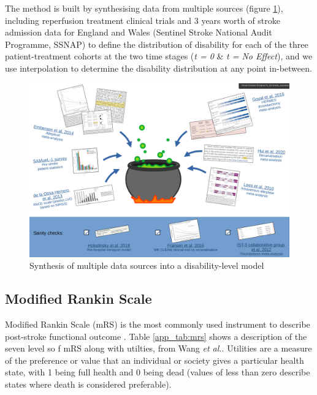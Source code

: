 The method is built by synthesising data from multiple sources (figure \ref{fig:cauldron}), including reperfusion treatment clinical trials \cite{lees_time_2010, emberson_effect_2014, goyal_endovascular_2016, fransen_time_2016, hui_efficacy_2020, de_la_ossa_herrero_design_2013} and 3 years worth of stroke admission data for England and Wales (Sentinel Stroke National Audit Programme, SSNAP) to define the distribution of disability for each of the three patient-treatment cohorts at the two time stages (\textit{t = 0} \& \textit{t = No Effect}), and we use interpolation to determine the disability distribution at any point in-between.

\begin{figure}[h]
    \centering
    \includegraphics[width=0.95\linewidth]{images/data_cauldron.png}
    \caption{Synthesis of multiple data sources into a disability-level model}
    \label{fig:cauldron}
\end{figure}

\subsection{Modified Rankin Scale}

Modified Rankin Scale (mRS) is the most commonly used instrument to describe post-stroke functional outcome . Table \ref{app_tab:mrs} shows a description of the seven level so f mRS along with utilties, from Wang \textit{et al.}\cite{wang_utility-weighted_2020}. Utilities are a measure of the preference or value that an individual or society gives a particular health state, with 1 being full health and 0 being dead (values of less than zero describe states where death is considered preferable).

